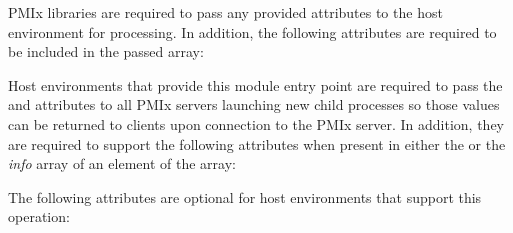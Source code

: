 \reqattrstart
\ac{PMIx} libraries are required to pass any provided attributes to the host environment for processing. In addition, the following attributes are required to be included in the passed  array:


\divider

Host environments that provide this module entry point are required to pass the  and  attributes to all \ac{PMIx} servers launching new child processes so those values can be returned to clients upon connection to the \ac{PMIx} server. In addition, they are required to support the following attributes when present in either the  or the \textit{info} array of an element of the  array:


\reqattrend

\optattrstart
The following attributes are optional for host environments that support this operation:


